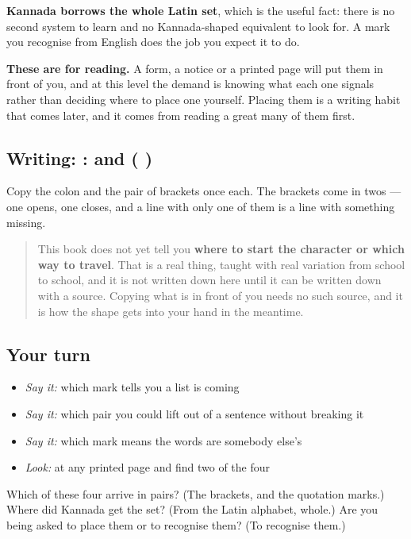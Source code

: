 \textbf{Kannada borrows the whole Latin set}, which is the useful fact: there is no second system to learn and no Kannada-shaped equivalent to look for. A mark you recognise from English does the job you expect it to do.

\textbf{These are for reading.} A form, a notice or a printed page will put them in front of you, and at this level the demand is knowing what each one signals rather than deciding where to place one yourself. Placing them is a writing habit that comes later, and it comes from reading a great many of them first.

\subsection*{Writing: : and ( )}
Copy the colon and the pair of brackets once each. The brackets come in twos — one opens, one closes, and a line with only one of them is a line with something missing.

\begin{quote}
This book does not yet tell you \textbf{where to start the character or which way to travel}. That is a real thing, taught with real variation from school to school, and it is not written down here until it can be written down with a source. Copying what is in front of you needs no such source, and it is how the shape gets into your hand in the meantime.
\end{quote}

\subsection*{Your turn}
\begin{itemize}
\raggedright
  \item \emph{Say it:} which mark tells you a list is coming
  \item \emph{Say it:} which pair you could lift out of a sentence without breaking it
  \item \emph{Say it:} which mark means the words are somebody else's
  \item \emph{Look:} at any printed page and find two of the four
\end{itemize}

\begin{tcolorbox}[breakable,colback=teal!4,colframe=teal!35!black,title={Before you move on}]
Which of these four arrive in pairs? (The brackets, and the quotation marks.) Where did Kannada get the set? (From the Latin alphabet, whole.) Are you being asked to place them or to recognise them? (To recognise them.)
\end{tcolorbox}
